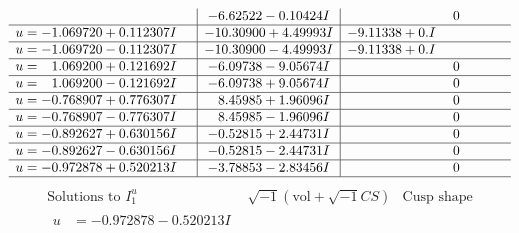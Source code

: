 \documentclass[1p]{elsarticle_modified}
\theoremstyle{definition}
\newcommand{\I}{\sqrt{-1}}
\begin{document}
$$\begin{array}{c|c|c}
 & -6.62522 - 0.10424 I & \phantom{-0.000000 } 0 \\ \hline\begin{aligned}
u &= -1.069720 + 0.112307 I\end{aligned}
 & -10.30900 + 4.49993 I & -9.11338 + 0. I\phantom{ +0.000000I} \\ \hline\begin{aligned}
u &= -1.069720 - 0.112307 I\end{aligned}
 & -10.30900 - 4.49993 I & -9.11338 + 0. I\phantom{ +0.000000I} \\ \hline\begin{aligned}
u &= \phantom{-}1.069200 + 0.121692 I\end{aligned}
 & -6.09738 - 9.05674 I & \phantom{-0.000000 } 0 \\ \hline\begin{aligned}
u &= \phantom{-}1.069200 - 0.121692 I\end{aligned}
 & -6.09738 + 9.05674 I & \phantom{-0.000000 } 0 \\ \hline\begin{aligned}
u &= -0.768907 + 0.776307 I\end{aligned}
 & \phantom{-}8.45985 + 1.96096 I & \phantom{-0.000000 } 0 \\ \hline\begin{aligned}
u &= -0.768907 - 0.776307 I\end{aligned}
 & \phantom{-}8.45985 - 1.96096 I & \phantom{-0.000000 } 0 \\ \hline\begin{aligned}
u &= -0.892627 + 0.630156 I\end{aligned}
 & -0.52815 + 2.44731 I & \phantom{-0.000000 } 0 \\ \hline\begin{aligned}
u &= -0.892627 - 0.630156 I\end{aligned}
 & -0.52815 - 2.44731 I & \phantom{-0.000000 } 0 \\ \hline\begin{aligned}
u &= -0.972878 + 0.520213 I\end{aligned}
 & -3.78853 - 2.83456 I & \phantom{-0.000000 } 0\\
 \hline 
 \end{array}$$\newpage$$\begin{array}{c|c|c}  
\text{Solutions to }I^u_{1}& \I (\text{vol} + \sqrt{-1}CS) & \text{Cusp shape}\\
 \hline 
\begin{aligned}
u &= -0.972878 - 0.520213 I\end{aligned}

\end{array}$$
\end{document}
